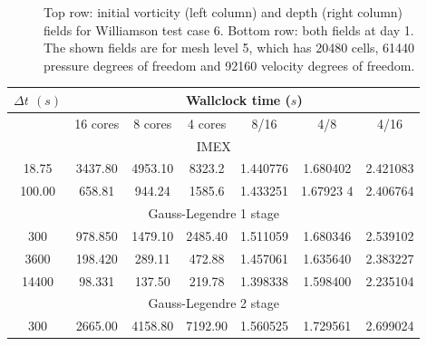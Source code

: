 \documentclass[a4paper, 12pt]{article}
\begin{document}
\begin{figure}
\begin{tabular}{cc}
 \end{tabular}\vspace{-10pt}
  \caption{Top row: initial vorticity (left column) and depth (right
    column) fields for Williamson test case 6. Bottom row: both fields
    at day 1. The shown fields are for mesh level 5, which has 20480
    cells, 61440 pressure degrees of freedom and 92160 velocity
    degrees of freedom.}
 \label{tc6_fields}
\end{figure}

\begin{table}[h]\centering
  \begin{tabular}{ccccccc}
    $\Delta t$ $(s)$ & \multicolumn{6}{c}{Wallclock time ($s$)} \\
    \hline
    &  16 cores  &  8 cores  & 4 cores  &   8/16   &   4/8     & 4/16     \\\hline
        \multicolumn{7}{c}{IMEX} \\
18.75 & 3437.80 & 4953.10 & 8323.2 & 1.440776 & 1.680402  & 2.421083\\
100.00 &  658.81 &  944.24&  1585.6 & 1.433251 & 1.67923 4& 2.406764\\
    \multicolumn{7}{c}{Gauss-Legendre 1 stage} \\
 300 & 978.850 & 1479.10 & 2485.40 & 1.511059    & 1.680346 & 2.539102\\
   3600 & 198.420 &  289.11 &  472.88 & 1.457061 & 1.635640 & 2.383227\\
  14400 &  98.331 &  137.50 &  219.78 & 1.398338 & 1.598400 & 2.235104\\
  \multicolumn{7}{c}{Gauss-Legendre 2 stage} \\
     300  & 2665.00  & 4158.80  & 7192.90  & 1.560525  & 1.729561 & 2.699024\\

\end{tabular}
\end{table}
\end{document}
